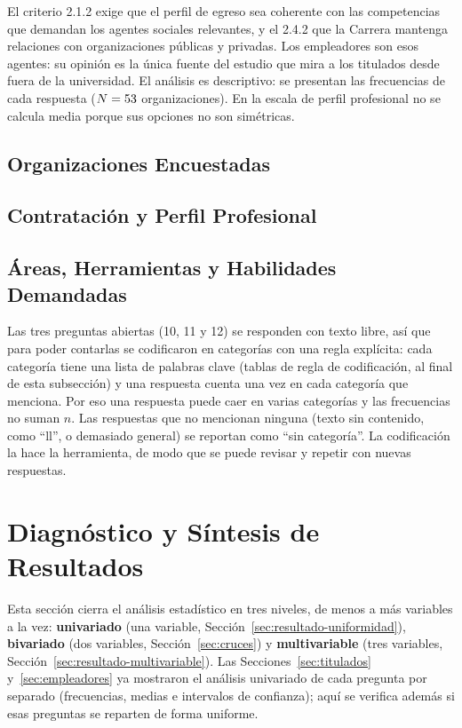 \documentclass[12pt, a4paper]{article}
\begin{document}
El criterio 2.1.2 exige que el perfil de egreso sea coherente con las
competencias que demandan los agentes sociales relevantes, y el 2.4.2
que la Carrera mantenga relaciones con organizaciones públicas y
privadas. Los empleadores son esos agentes: su opinión es la única
fuente del estudio que mira a los titulados desde fuera de la
universidad. El análisis es descriptivo: se presentan las frecuencias
de cada respuesta ($N=53$ organizaciones). En la escala de perfil
profesional no se calcula media porque sus opciones no son simétricas.

\subsection{Organizaciones Encuestadas}



\subsection{Contratación y Perfil Profesional}



\subsection{Áreas, Herramientas y Habilidades Demandadas}

Las tres preguntas abiertas (10, 11 y 12) se responden con texto libre,
así que para poder contarlas se codificaron en categorías con una regla
explícita: cada categoría tiene una lista de palabras clave
(tablas de regla de codificación, al final de esta subsección) y una
respuesta cuenta una vez en cada categoría que menciona. Por eso una
respuesta puede caer en varias categorías y las frecuencias no suman
$n$. Las respuestas que no mencionan ninguna (texto sin contenido, como
``ll'', o demasiado general) se reportan como ``sin categoría''. La
codificación la hace la herramienta, de modo que se puede revisar y
repetir con nuevas respuestas.





\section{Diagnóstico y Síntesis de Resultados}

Esta sección cierra el análisis estadístico en tres niveles, de menos a
más variables a la vez: \textbf{univariado} (una variable, Sección~\ref{sec:resultado-uniformidad}),
\textbf{bivariado} (dos variables, Sección~\ref{sec:cruces}) y
\textbf{multivariable} (tres variables, Sección~\ref{sec:resultado-multivariable}).
Las Secciones~\ref{sec:titulados} y~\ref{sec:empleadores} ya mostraron el
análisis univariado de cada pregunta por separado (frecuencias, medias e
intervalos de confianza); aquí se verifica además si esas preguntas se
reparten de forma uniforme.
\end{document}
